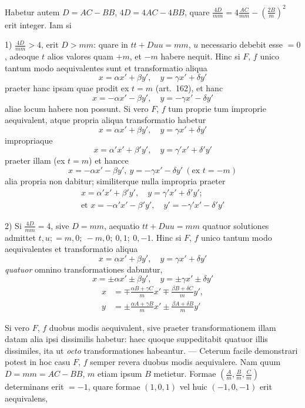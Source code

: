 Habetur autem $D=AC-BB$, $4D=4AC-4BB$, quare $\frac{4D}{mm}=4\frac{AC}{mm}-(\frac{2B}{m})^2$ erit integer. Iam si

1) $\frac{4D}{mm}>4$, erit $D>mm$: quare in $tt+Duu=mm$, $u$ necessario debebit esse $=0$, adeoque $t$ alios valores quam $+m$, et $-m$ habere nequit. Hinc
si $F$, $f$ unico tantum modo aequivalentes sunt et transformatio aliqua
\[
x=\alpha x'+\beta y',\quad y=\gamma x'+\delta y'
\]
praeter hanc ipsam quae prodit ex $t=m$ (art.\ 162), et hanc
\[
x=-\alpha x'-\beta y',\quad y=-\gamma x'-\delta y'
\]
aliae locum habere non possunt. Si vero $F$, $f$ tum proprie tum improprie aequivalent, atque propria aliqua transformatio habetur
\[
x=\alpha x'+\beta y',\quad y=\gamma x'+\delta y'
\]
impropriaque
\[
x=\alpha'x'+\beta'y',\quad y=\gamma'x'+\delta'y'
\]
praeter illam (ex $t=m$) et hancce
\[
x=-\alpha x'-\beta y',\ y=-\gamma x'-\delta y'\ (\text{ex }t=-m)
\]
alia propria non dabitur; similiterque nulla impropria praeter
\[
\begin{gathered}
x=\alpha'x'+\beta'y',\quad y=\gamma'x'+\delta'y';\\
\text{et }x=-\alpha'x'-\beta'y',\quad y'=-\gamma'x'-\delta'y'
\end{gathered}
\]

2) Si $\frac{4D}{mm}=4$, sive $D=mm$, aequatio $tt+Duu=mm$ quatuor solutiones admittet $t,u;=m,0;\ -m,0;\ 0,1;\ 0,-1$. Hinc si $F$, $f$ unico tantum modo aequivalentes et transformatio aliqua
\[
x=\alpha x'+\beta y',\quad y=\gamma x'+\delta y'
\]
\emph{quatuor} omnino transformationes dabuntur,
\[
x=\pm\alpha x'\pm\beta y',\quad y=\pm\gamma x'\pm\delta y'
\]
\[
\begin{aligned}
x&=\mp\frac{\alpha B+\gamma C}{m}x'\mp\frac{\beta B+\delta C}{m}y',\\
y&=\pm\frac{\alpha A+\gamma B}{m}x'\pm\frac{\beta A+\delta B}{m}y'
\end{aligned}
\]

Si vero $F$, $f$ duobus modis aequivalent, sive praeter transformationem illam datam alia ipsi dissimilis habetur: haec quoque suppeditabit quatuor illis dissimiles, ita ut \emph{octo} transformationes habeantur. --- Ceterum facile demonstrari potest in hoc casu $F$, $f$ semper revera duobus modis aequivalere. Nam quum $D=mm=AC-BB$, $m$ etiam ipsum $B$ metietur. Formae $(\frac{A}{m},\frac{B}{m},\frac{C}{m})$ determinans erit $=-1$, quare formae $(1,0,1)$ vel huic $(-1,0,-1)$ erit aequivalens,
